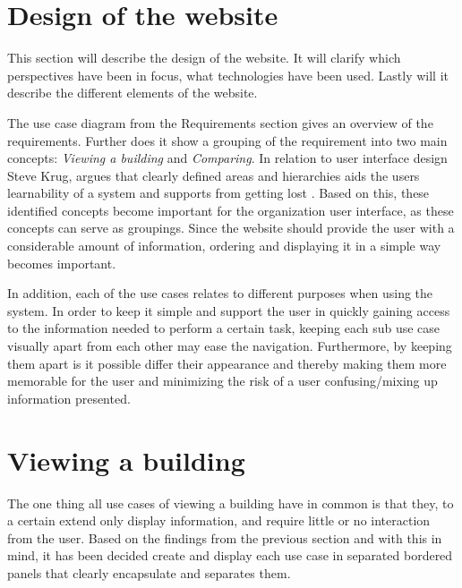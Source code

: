 \section{Design of the website}
This section will describe the design of the website. It will clarify which perspectives have been in focus, what technologies have been used. Lastly will it describe the different elements of the website.

The use case diagram from the Requirements section gives an overview of the requirements. Further does it show a grouping of the requirement into two main concepts: \emph{Viewing a building} and \emph{Comparing}. In relation to user interface design Steve Krug, argues that clearly defined areas and hierarchies aids the users learnability of a system and supports from getting lost \cite{interaction}. Based on this, these identified concepts become important for the organization user interface, as these concepts can serve as groupings. Since the website should provide the user with a considerable amount of information, ordering and displaying it in a simple way becomes important.

In addition, each of the use cases relates to different purposes when using the system. In order to keep it simple and support the user in quickly gaining access to the information needed to perform a certain task, keeping each sub use case visually apart from each other may ease the navigation. Furthermore, by keeping them apart is it possible differ their appearance and thereby making them more memorable for the user and minimizing the risk of a user confusing/mixing up information presented.
\section*{Viewing a building}
The one thing all use cases of viewing a building have in common is that they, to a certain extend only display information, and require little or no interaction from the user. Based on the findings from the previous section and with this in mind, it has been decided create and display each use case in separated bordered panels that clearly encapsulate and separates them.
